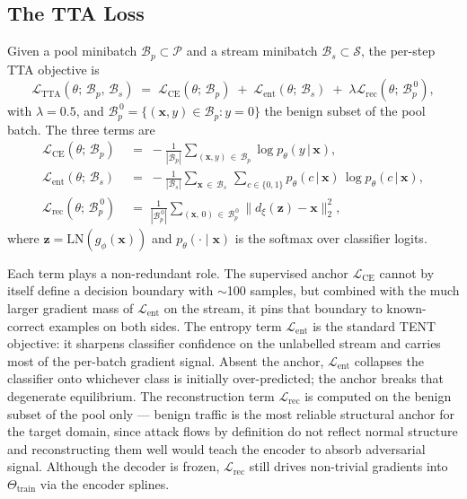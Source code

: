\documentclass[10pt, conference, letterpaper]{IEEEtran}
\begin{document}
\subsection{The TTA Loss}
\label{sec:loss}

Given a pool minibatch $\mathcal{B}_p \subset \mathcal{P}$ and a stream minibatch $\mathcal{B}_s \subset \mathcal{S}$, the per-step TTA objective is
\begin{equation}
\label{eq:tta}
\mathcal{L}_{\text{TTA}}\!\left(\theta;\, \mathcal{B}_p,\, \mathcal{B}_s\right) \;=\;  \mathcal{L}_{\text{CE}}\!\left(\theta;\, \mathcal{B}_p\right) \;+\;  \mathcal{L}_{\text{ent}}\!\left(\theta;\, \mathcal{B}_s\right) \;+\; \lambda \mathcal{L}_{\text{rec}}\!\left(\theta;\, \mathcal{B}_p^{\,0}\right),
\end{equation}
with $\lambda = 0.5$, and $\mathcal{B}_p^{\,0} = \{(\mathbf{x}, y) \in \mathcal{B}_p : y = 0\}$ the benign subset of the pool batch. The three terms are
\begin{align}
\label{eq:loss-ce}
\mathcal{L}_{\text{CE}}\!\left(\theta;\, \mathcal{B}_p\right) &\;=\; -\frac{1}{|\mathcal{B}_p|}\sum_{(\mathbf{x}, y) \,\in\, \mathcal{B}_p} \log p_\theta\!\left(y \,\big|\, \mathbf{x}\right), \\[2pt]
\label{eq:loss-ent}
\mathcal{L}_{\text{ent}}\!\left(\theta;\, \mathcal{B}_s\right) &\;=\; -\frac{1}{|\mathcal{B}_s|}\sum_{\mathbf{x} \,\in\, \mathcal{B}_s}\,\sum_{c \in \{0, 1\}} p_\theta\!\left(c \,\big|\, \mathbf{x}\right)\,\log p_\theta\!\left(c \,\big|\, \mathbf{x}\right), \\[2pt]
\label{eq:loss-rec}
\mathcal{L}_{\text{rec}}\!\left(\theta;\, \mathcal{B}_p^{\,0}\right) &\;=\; \frac{1}{|\mathcal{B}_p^{\,0}|}\sum_{(\mathbf{x},\, 0) \,\in\, \mathcal{B}_p^{\,0}} \big\| d_\xi\!\left(\mathbf{z}\right) - \mathbf{x} \big\|_2^2,
\end{align}
where $\mathbf{z} = \mathrm{LN}\!\left(g_\phi(\mathbf{x})\right)$ and $p_\theta(\cdot \mid \mathbf{x})$ is the softmax over classifier logits.

Each term plays a non-redundant role. The supervised anchor $\mathcal{L}_{\text{CE}}$ cannot by itself define a decision boundary with $\sim$100 samples, but combined with the much larger gradient mass of $\mathcal{L}_{\text{ent}}$ on the stream, it pins that boundary to known-correct examples on both sides. The entropy term $\mathcal{L}_{\text{ent}}$ is the standard TENT~\cite{wang2021tent} objective: it sharpens classifier confidence on the unlabelled stream and carries most of the per-batch gradient signal. Absent the anchor, $\mathcal{L}_{\text{ent}}$ collapses the classifier onto whichever class is initially over-predicted; the anchor breaks that degenerate equilibrium. The reconstruction term $\mathcal{L}_{\text{rec}}$ is computed on the benign subset of the pool only --- benign traffic is the most reliable structural anchor for the target domain, since attack flows by definition do not reflect normal structure and reconstructing them well would teach the encoder to absorb adversarial signal. Although the decoder is frozen, $\mathcal{L}_{\text{rec}}$ still drives non-trivial gradients into $\Theta_{\text{train}}$ via the encoder splines.
\end{document}
